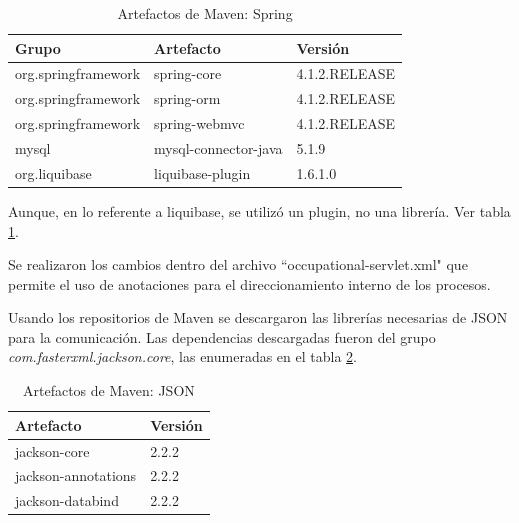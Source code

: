     \begin{table}[h!]
        
        \begin{center}
            \begin{tabular}{|l|l|l|}\hline
                Grupo & Artefacto & Versión \\\hline
                org.springframework & spring-core & 4.1.2.RELEASE \\\hline
                org.springframework & spring-orm & 4.1.2.RELEASE \\\hline
                org.springframework & spring-webmvc & 4.1.2.RELEASE \\\hline
                mysql & mysql-connector-java & 5.1.9 \\\hline
                org.liquibase & liquibase-plugin & 1.6.1.0 \\\hline
            \end{tabular}
        \end{center}
        
        \caption{Artefactos de Maven: Spring}
        \label{artefactos-spring}
    \end{table}
    
    Aunque, en lo referente a liquibase, se utilizó un plugin, no una librería. Ver tabla \ref{artefactos-spring}.
    
    Se realizaron los cambios dentro del archivo ``occupational-servlet.xml" que permite el uso de anotaciones para el direccionamiento interno de los procesos.
    
    Usando los repositorios de Maven se descargaron las librerías necesarias de JSON para la comunicación. Las dependencias descargadas fueron del grupo \textit{com.fasterxml.jackson.core}, las enumeradas en el tabla \ref{artefactos-json}.
     
    \begin{table}[h!]
         
        \begin{center}
            \begin{tabular}{|l|l|}\hline
                Artefacto & Versión \\\hline
                jackson-core & 2.2.2 \\\hline
                jackson-annotations & 2.2.2 \\\hline
                jackson-databind & 2.2.2 \\\hline                   
            \end{tabular}
        \end{center}
        
        \caption{Artefactos de Maven: JSON}
        \label{artefactos-json}
    \end{table}
    
